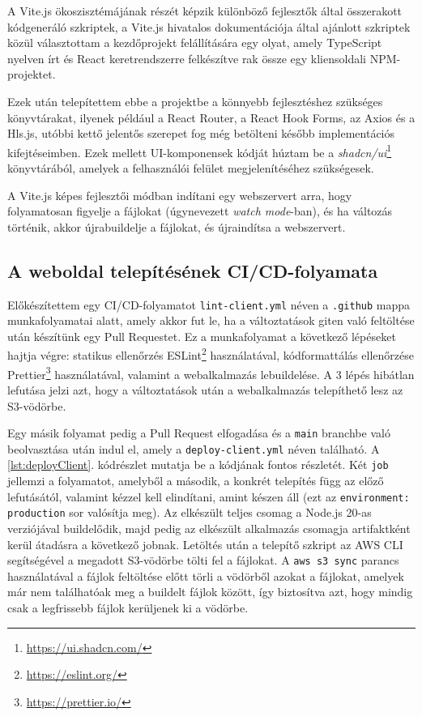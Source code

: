 A Vite.js ökoszisztémájának részét képzik különböző fejlesztők által összerakott kódgeneráló szkriptek, a Vite.js hivatalos dokumentációja által ajánlott szkriptek közül választottam a kezdőprojekt felállítására egy olyat, amely TypeScript nyelven írt és React keretrendszerre felkészítve rak össze egy kliensoldali NPM-projektet.

Ezek után telepítettem ebbe a projektbe a könnyebb fejlesztéshez szükséges könyvtárakat, ilyenek például a React Router, a React Hook Forms, az Axios és a Hls.js, utóbbi kettő jelentős szerepet fog még betölteni később implementációs kifejtéseimben. Ezek mellett UI-komponensek kódját húztam be a \emph{shadcn/ui}\footnote{\url{https://ui.shadcn.com/}} könyvtárából, amelyek a felhasználói felület megjelenítéséhez szükségesek.

A Vite.js képes fejlesztői módban indítani egy webszervert arra, hogy folyamatosan figyelje a fájlokat (úgynevezett \emph{watch mode}-ban), és ha változás történik, akkor újrabuildelje a fájlokat, és újraindítsa a webszervert.

\subsection{A weboldal telepítésének CI/CD-folyamata}\label{sec:ciCd}

Előkészítettem egy CI/CD-folyamatot \verb|lint-client.yml| néven a \verb|.github| mappa munkafolyamatai alatt, amely akkor fut le, ha a változtatások giten való feltöltése után készítünk egy Pull Requestet. Ez a munkafolyamat a következő lépéseket hajtja végre: statikus ellenőrzés ESLint\footnote{\url{https://eslint.org/}} használatával, kódformattálás ellenőrzése Prettier\footnote{\url{https://prettier.io/}} használatával, valamint a webalkalmazás lebuildelése. A 3 lépés hibátlan lefutása jelzi azt, hogy a változtatások után a webalkalmazás telepíthető lesz az S3-vödörbe.

Egy másik folyamat pedig a Pull Request elfogadása és a \verb|main| branchbe való beolvasztása után indul el, amely a \verb|deploy-client.yml| néven található. A \ref{lst:deployClient}. kódrészlet mutatja be a kódjának fontos részletét. Két \verb|job| jellemzi a folyamatot, amelyből a második, a konkrét telepítés függ az előző lefutásától, valamint kézzel kell elindítani, amint készen áll (ezt az \verb|environment: production| sor valósítja meg). Az elkészült teljes csomag a Node.js 20-as verziójával buildelődik, majd pedig az elkészült alkalmazás csomagja artifaktként kerül átadásra a következő jobnak. Letöltés után a telepítő szkript az AWS CLI segítségével a megadott S3-vödörbe tölti fel a fájlokat. A \verb|aws s3 sync| parancs használatával a fájlok feltöltése előtt törli a vödörből azokat a fájlokat, amelyek már nem találhatóak meg a buildelt fájlok között, így biztosítva azt, hogy mindig csak a legfrissebb fájlok kerüljenek ki a vödörbe.

